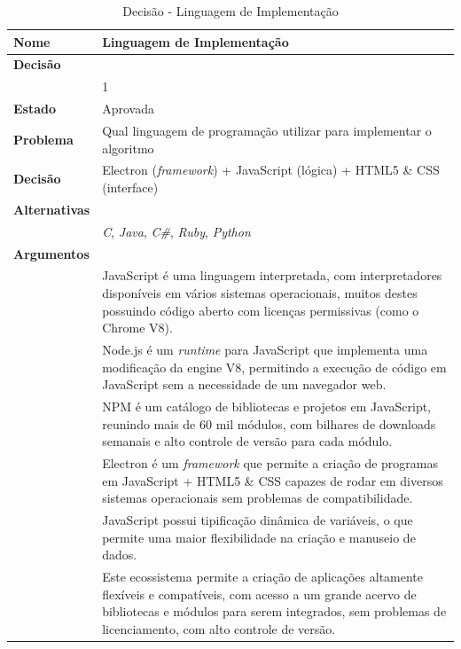 \documentclass[12pt]{article}
\begin{document}
\begingroup
\renewcommand*{\arraystretch}{1.2}
\begin{table}[H]
	\caption{Decisão - Linguagem de Implementação}
	\begin{tabular}{p{3cm} p{11cm}}
		\textbf{Nome}		&	Linguagem de Implementação \\
		\toprule
		\textbf{Decisão}	&   \\
							& 1 \\
		\toprule
		\midrule
		\textbf{Estado}		& Aprovada \\
		\midrule
		\textbf{Problema}	& Qual linguagem de programação utilizar para implementar o algoritmo\\
		\midrule
		\textbf{Decisão}	& Electron (\textit{framework}) + JavaScript (lógica)
							  + HTML5 \& CSS (interface)\\
		\midrule
		\textbf{Alternativas} & \\
		& \textit{C}, \textit{Java}, \textit{C\#}, \textit{Ruby}, \textit{Python} \\
		\midrule
		\textbf{Argumentos} & \\
		& JavaScript é uma linguagem interpretada, com interpretadores disponíveis em vários
		  sistemas operacionais, muitos destes possuindo código aberto com licenças permissivas
		  (como o Chrome V8).\\
		& Node.js é um \textit{runtime} para JavaScript que implementa uma modificação da engine V8,
		  permitindo a execução de código em JavaScript sem a necessidade de um navegador web.\\
		& NPM é um catálogo de bibliotecas e projetos em JavaScript, reunindo mais de 60 mil
		  módulos, com bilhares de downloads semanais e alto controle de versão para cada módulo.\\
		& Electron é um \textit{framework} que permite a criação de programas em 
		  JavaScript + HTML5 \& CSS capazes de rodar em diversos sistemas operacionais 
		  sem problemas de compatibilidade.\\
		& JavaScript possui tipificação dinâmica de variáveis, o que permite uma maior
		  flexibilidade na criação e manuseio de dados.\\
		& Este ecossistema permite a criação de aplicações altamente flexíveis e compatíveis,
		  com acesso a um grande acervo de bibliotecas e módulos para serem integrados,
		  sem problemas de licenciamento, com alto controle de versão.\\
		\bottomrule
	\end{tabular}		
\end{table}
\endgroup
\end{document}
